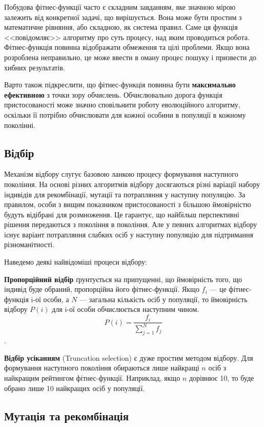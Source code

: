 Побудова фітнес-функції часто є складним завданням, 
яке значною мірою залежить від конкретної задачі, що вирішується. 
Вона може бути простим з математичне рівняння, або складною, 
як система правил. 
Саме ця функція <<повідомляє>> алгоритму про суть процесу, над яким
проводиться робота.
Фітнес-функція повинна відображати обмеження та цілі проблеми.
Якщо вона розроблена неправильно, це може ввести в оману 
процес пошуку і призвести до хибних результатів.

Варто також підкреслити, що фітнес-функція повинна бути 
\textbf{максимально ефективною} з точки зору обчислень. 
Обчислювально дорога функція пристосованості може значно 
сповільнити роботу еволюційного алгоритму, оскільки її 
потрібно обчислювати для кожної особини в популяції в кожному поколінні.


\subsection{Відбір}

Механізм відбору слугує базовою ланкою процесу формування наступного покоління.
На основі різних алгоритмів відбору досягаються різні варіації набору
індивідів для рекомбінації, мутації та потрапляння у наступну популяцію.
За правилом, особи з вищим показником пристосованості з 
більшою ймовірністю будуть відібрані для розмноження. 
Це гарантує, що найбільш перспективні рішення передаються з 
покоління в покоління.
Але у певних алгоритмах відбору існує варіант потрапляння
слабких осіб у наступну популяцію для підтримання різноманітності.

Наведемо деякі найвідоміші процеси відбору:


\textbf{Пропорційний відбір} ґрунтується на припущенні, що 
ймовірність того, що індивід буде обраний, пропорційна 
його фітнес-функції. 
Якщо $f_i$ --- це фітнес-функція i-ої особи, 
а $N$ --- загальна кількість осіб у популяції, 
то ймовірність відбору $P(i)$ для i-ої особи обчислюється наступним чином.
\[
P(i) = \frac{f_i}{\sum_{j=1}^{N} f_j}
\].

\textbf{Відбір усіканням} (Truncation selection) є дуже простим методом відбору.
Для формування наступного покоління обираються лише найкращі $n$
осіб з найкращим рейтингом фітнес-функції.
Наприклад, якщо $n$ дорівнює 10, то буде обрано лише 10 найкращих
осіб у популяції.


\subsection{Мутація та рекомбінація}

